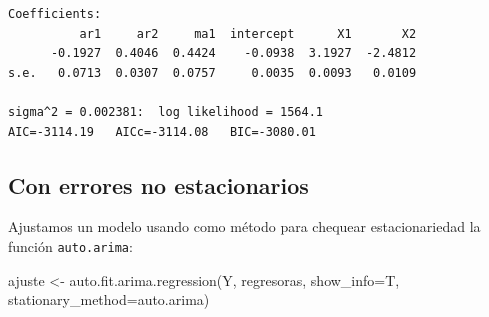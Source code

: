 \documentclass[
  12pt,
  a4paper]{article}
\newenvironment{Shaded}{\begin{snugshade}}{\end{snugshade}}
\newcommand{\AttributeTok}[1]{\textcolor[rgb]{0.77,0.63,0.00}{#1}}
\newcommand{\CommentTok}[1]{\textcolor[rgb]{0.56,0.35,0.01}{\textit{#1}}}
\newcommand{\DecValTok}[1]{\textcolor[rgb]{0.00,0.00,0.81}{#1}}
\newcommand{\FloatTok}[1]{\textcolor[rgb]{0.00,0.00,0.81}{#1}}
\newcommand{\FunctionTok}[1]{\textcolor[rgb]{0.00,0.00,0.00}{#1}}
\newcommand{\NormalTok}[1]{#1}
\newcommand{\OtherTok}[1]{\textcolor[rgb]{0.56,0.35,0.01}{#1}}
\newcommand{\SpecialCharTok}[1]{\textcolor[rgb]{0.00,0.00,0.00}{#1}}
\newcommand{\StringTok}[1]{\textcolor[rgb]{0.31,0.60,0.02}{#1}}
\begin{document}
\begin{verbatim}
Coefficients:
          ar1     ar2     ma1  intercept      X1       X2
      -0.1927  0.4046  0.4424    -0.0938  3.1927  -2.4812
s.e.   0.0713  0.0307  0.0757     0.0035  0.0093   0.0109

sigma^2 = 0.002381:  log likelihood = 1564.1
AIC=-3114.19   AICc=-3114.08   BIC=-3080.01
\end{verbatim}

\hypertarget{con-errores-no-estacionarios}{%
\subsection{Con errores no
estacionarios}\label{con-errores-no-estacionarios}}

\begin{Shaded}
\end{Shaded}

Ajustamos un modelo usando como método para chequear estacionariedad la
función \texttt{auto.arima}:

\begin{Shaded}
\begin{Highlighting}[]
\NormalTok{ajuste }\OtherTok{\textless{}{-}} \FunctionTok{auto.fit.arima.regression}\NormalTok{(Y, regresoras, }\AttributeTok{show\_info=}\NormalTok{T, }
                                    \AttributeTok{stationary\_method=}\StringTok{\textquotesingle{}auto.arima\textquotesingle{}}\NormalTok{)}
\end{Highlighting}
\end{Shaded}
\end{document}
